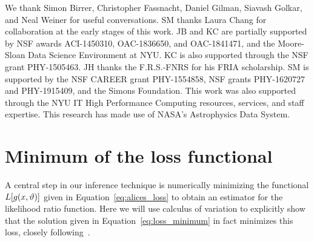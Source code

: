 \documentclass[twocolumn]{aastex63}
\begin{document}
\acknowledgments

We thank Simon Birrer, Christopher Fassnacht, Daniel Gilman, Siavash Golkar, and Neal Weiner for useful conversations. SM thanks Laura Chang for collaboration at the early stages of this work. JB and KC are partially supported by NSF awards ACI-1450310, OAC-1836650, and OAC-1841471, and the Moore-Sloan Data Science Environment at NYU. KC is also supported through the NSF grant PHY-1505463. JH thanks the F.R.S.-FNRS for his FRIA scholarship. SM is supported by the NSF CAREER grant PHY-1554858, NSF grants PHY-1620727 and PHY-1915409, and the Simons Foundation. This work was also supported through the NYU IT High Performance Computing resources, services, and staff expertise. This research has made use of NASA's Astrophysics Data System.


\appendix
\section{Minimum of the loss functional}
\label{app:variation}

A central step in our inference technique is numerically minimizing the functional $L[g(x, \vartheta)]$ given in Equation~\eqref{eq:alices_loss} to obtain an estimator for the likelihood ratio function. Here we will use calculus of variation to explicitly show that the solution given in Equation~\eqref{eq:loss_minimum} in fact minimizes this loss, closely following~\citet{1805.00020, Stoye:2018ovl}.
\end{document}
